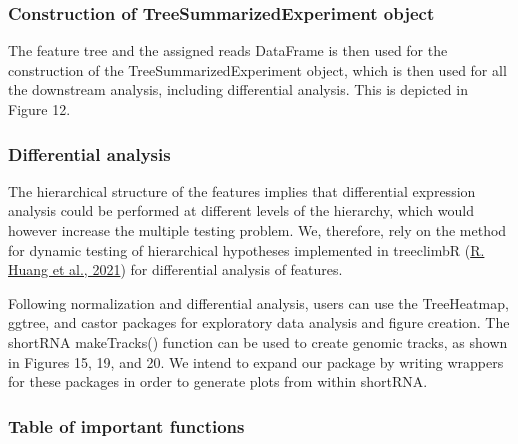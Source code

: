 \documentclass[12pt,twoside]{reedthesis}
\begin{document}
\hypertarget{construction-of-treesummarizedexperiment-object}{%
\subsubsection{Construction of TreeSummarizedExperiment object}\label{construction-of-treesummarizedexperiment-object}}

The feature tree and the assigned reads DataFrame is then used for the
construction of the TreeSummarizedExperiment object, which is then used
for all the downstream analysis, including differential analysis. This
is depicted in Figure 12.

\hypertarget{differential-analysis}{%
\subsubsection{Differential analysis}\label{differential-analysis}}

The hierarchical structure of the features implies that differential
expression analysis could be performed at different levels of the
hierarchy, which would however increase the multiple testing problem.
We, therefore, rely on the method for dynamic testing of hierarchical
hypotheses implemented in treeclimbR (\protect\hyperlink{ref-huang2021}{R. Huang et al., 2021}) for differential
analysis of features.

Following normalization and differential analysis, users can use the
TreeHeatmap, ggtree, and castor packages for exploratory data analysis
and figure creation. The shortRNA makeTracks() function can be used to
create genomic tracks, as shown in Figures 15, 19, and 20. We intend to
expand our package by writing wrappers for these packages in order to
generate plots from within shortRNA.

\hypertarget{table-of-important-functions}{%
\subsubsection{Table of important functions}\label{table-of-important-functions}}
\end{document}

